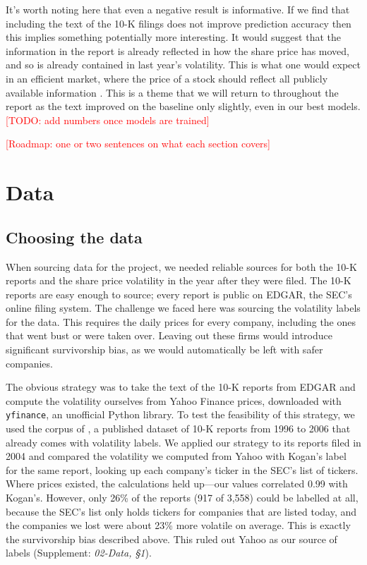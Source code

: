 \documentclass[11pt,a4paper]{article}
\newcommand{\supp}[1]{(Supplement: \textit{#1})}
\newcommand{\placeholder}[1]{\textcolor{red}{[#1]}}
\begin{document}
It's worth noting here that even a negative result is informative. If we find that including the text of the 10-K filings does not improve prediction accuracy then this implies something potentially more interesting. It would suggest that the information in the report is already reflected in how the share price has moved, and so is already contained in last year's volatility. This is what one would expect in an efficient market, where the price of a stock should reflect all publicly available information \citep{fama1970}. This is a theme that we will return to throughout the report as the text improved on the baseline only slightly, even in our best models. \placeholder{TODO: add numbers once models are trained}

\placeholder{Roadmap: one or two sentences on what each section covers}

\section{Data}\label{sec:data}

\subsection{Choosing the data}\label{sec:data-choice}
When sourcing data for the project, we needed reliable sources for both the 10-K reports and the share price volatility in the year after they were filed. The 10-K reports are easy enough to source; every report is public on EDGAR, the SEC's online filing system. The challenge we faced here was sourcing the volatility labels for the data. This requires the daily prices for every company, including the ones that went bust or were taken over. Leaving out these firms would introduce significant survivorship bias, as we would automatically be left with safer companies.

The obvious strategy was to take the text of the 10-K reports from EDGAR and compute the volatility ourselves from Yahoo Finance prices, downloaded with \texttt{yfinance}, an unofficial Python library. To test the feasibility of this strategy, we used the corpus of \citet{kogan2009}, a published dataset of 10-K reports from 1996 to 2006 that already comes with volatility labels. We applied our strategy to its reports filed in 2004 and compared the volatility we computed from Yahoo with Kogan's label for the same report, looking up each company's ticker in the SEC's list of tickers. Where prices existed, the calculations held up---our values correlated 0.99 with Kogan's. However, only 26\% of the reports (917 of 3,558) could be labelled at all, because the SEC's list only holds tickers for companies that are listed today, and the companies we lost were about 23\% more volatile on average. This is exactly the survivorship bias described above. This ruled out Yahoo as our source of labels \supp{02-Data, \S1}.
\end{document}
